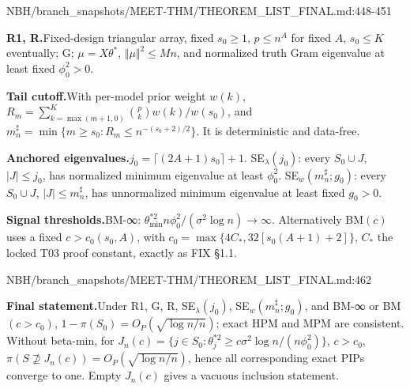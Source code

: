 \begin{stmt}{NBH/branch_snapshots/MEET-THM/THEOREM_LIST_FINAL.md:448-451}
\par\smallskip\noindent\textbf{R1, R.}\enspace Fixed-design triangular array, fixed \(s_0\ge1\), \(p\le n^A\) for fixed \(A\), \(s_0\le K\) eventually; G; \(\mu=X\theta^*\), \(\Vert\mu\Vert^2\le Mn\), and normalized truth Gram eigenvalue at least fixed \(\phi_0^2>0\).
\par\smallskip\noindent\textbf{Tail cutoff.}\enspace With per-model prior weight \(w(k)\), \(R_m=\sum_{k=\max(m+1,0)}^K\binom pk w(k)/w(s_0)\), and \(m_n^\sharp=\min\{m\ge s_0:R_m\le n^{-(s_0+2)/2}\}\). It is deterministic and data-free.
\par\smallskip\noindent\textbf{Anchored eigenvalues.}\enspace \(j_0=\lceil(2A+1)s_0\rceil+1\). SE\(_\lambda(j_0)\): every \(S_0\cup J\), \(\lvert J\rvert\le j_0\), has normalized minimum eigenvalue at least \(\phi_0^2\). SE\(_w(m_n^\sharp;g_0)\): every \(S_0\cup J\), \(\lvert J\rvert\le m_n^\sharp\), has unnormalized minimum eigenvalue at least fixed \(g_0>0\).
\par\smallskip\noindent\textbf{Signal thresholds.}\enspace BM-∞: \(\theta_{\min}^{*2}n\phi_0^2/(\sigma^2\log n)\to\infty\). Alternatively BM\((c)\) uses a fixed \(c>c_0(s_0,A)\), with \(c_0=\max\{4C_*,32[s_0(A+1)+2]\}\), \(C_*\) the locked T03 proof constant, exactly as FIX §1.1.
\end{stmt}

\begin{stmt}{NBH/branch_snapshots/MEET-THM/THEOREM_LIST_FINAL.md:462}
\par\smallskip\noindent\textbf{Final statement.}\enspace Under R1, G, R, SE\(_\lambda(j_0)\), SE\(_w(m_n^\sharp;g_0)\), and BM-∞ or BM\((c>c_0)\), \(1-\pi(S_0)=O_P(\sqrt{\log n/n})\); exact HPM and MPM are consistent. Without beta-min, for \(J_n(c)=\{j\in S_0:\theta_j^{*2}\ge c\sigma^2\log n/(n\phi_0^2)\}\), \(c>c_0\), \(\pi(S\not\supseteq J_n(c))=O_P(\sqrt{\log n/n})\), hence all corresponding exact PIPs converge to one. Empty \(J_n(c)\) gives a vacuous inclusion statement.
\end{stmt}

